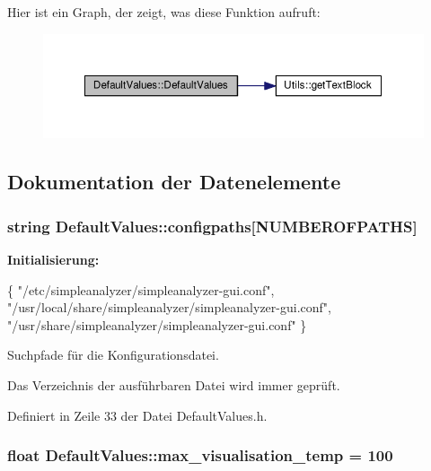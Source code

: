 Hier ist ein Graph, der zeigt, was diese Funktion aufruft\-:
\nopagebreak
\begin{figure}[H]
\begin{center}
\leavevmode
\includegraphics[width=350pt]{classDefaultValues_ad960d7716705d593d4f1e203c2f64c1d_cgraph}
\end{center}
\end{figure}




\subsection{Dokumentation der Datenelemente}
\hypertarget{classDefaultValues_a0c95426ed23ffb6f41da68842984f3d3}{
\subsubsection[{configpaths}]{\setlength{\rightskip}{0pt plus 5cm}string Default\-Values\-::configpaths\mbox{[}{\bf N\-U\-M\-B\-E\-R\-O\-F\-P\-A\-T\-H\-S}\mbox{]}}}\label{classDefaultValues_a0c95426ed23ffb6f41da68842984f3d3}
{\bfseries Initialisierung\-:}
\begin{DoxyCode}
\{
            \textcolor{stringliteral}{"/etc/simpleanalyzer/simpleanalyzer-gui.conf"},
            \textcolor{stringliteral}{"/usr/local/share/simpleanalyzer/simpleanalyzer-gui.conf"},
            \textcolor{stringliteral}{"/usr/share/simpleanalyzer/simpleanalyzer-gui.conf"} \}
\end{DoxyCode}


Suchpfade für die Konfigurationsdatei. 

Das Verzeichnis der ausführbaren Datei wird immer geprüft. 

Definiert in Zeile 33 der Datei Default\-Values.\-h.

\hypertarget{classDefaultValues_a9bb20fa7d05044c972db7d296f1091b8}{
\subsubsection[{max\-\_\-visualisation\-\_\-temp}]{\setlength{\rightskip}{0pt plus 5cm}float Default\-Values\-::max\-\_\-visualisation\-\_\-temp = 100}}\label{classDefaultValues_a9bb20fa7d05044c972db7d296f1091b8}


